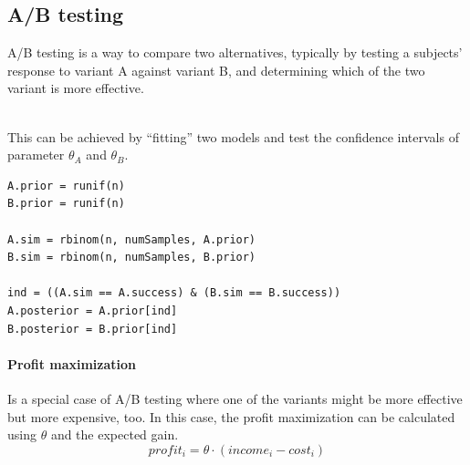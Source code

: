 \subsection{A/B testing}
A/B testing is a way to compare two alternatives, typically by testing a subjects' response to variant A against variant B, and determining which of the two variant is more effective.

\mbox{}\\
This can be achieved by ``fitting'' two models and test the confidence intervals of parameter $\theta_A$ and $\theta_B$.

\begin{lstlisting}
A.prior = runif(n)
B.prior = runif(n)

A.sim = rbinom(n, numSamples, A.prior)
B.sim = rbinom(n, numSamples, B.prior)

ind = ((A.sim == A.success) & (B.sim == B.success))
A.posterior = A.prior[ind]
B.posterior = B.prior[ind]
\end{lstlisting}

\paragraph{Profit maximization}
Is a special case of A/B testing where one of the variants might be more effective but more expensive, too. In this case, the profit maximization can be calculated using $\theta$ and the expected gain.
\begin{equation*}
profit_i = \theta \cdot (income_i - cost_i)
\end{equation*}
